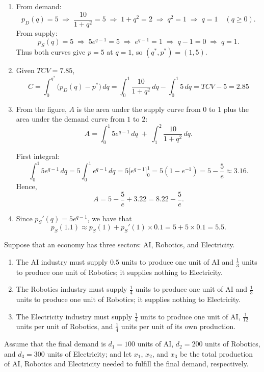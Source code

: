 \documentclass[11pt]{exam}
\begin{document}
\begin{questions}
\begin{solution}[0cm]
\begin{enumerate}[leftmargin = 0.5cm, label = (\alph*), rightmargin = 0.2cm]
    \item 
    From demand:
    \[
        p_D(q) = 5 
        \;\Rightarrow\; \frac{10}{1+q^2} = 5 
        \;\Rightarrow\; 1 + q^2 = 2 
        \;\Rightarrow\; q^2 = 1 
        \;\Rightarrow\; q = 1 \quad (q \ge 0).
    \]
    From supply:
    \[
        p_S(q) = 5 
        \;\Rightarrow\; 5e^{q-1} = 5 
        \;\Rightarrow\; e^{q-1} = 1 
        \;\Rightarrow\; q - 1 = 0 
        \;\Rightarrow\; q = 1.
    \]
    Thus both curves give $p = 5$ at $q = 1$, so $(q^*,p^*) = (1,5)$.

    \item Given $TCV = 7.85$,
    \[
        C = \int_0^{q^*} \bigl(p_D(q) - p^*\bigr)\,dq
          = \int_0^{1} \frac{10}{1+q^2}\,dq - \int_0^{1} 5\,dq
          = TCV - 5 = 2.85
    \]

    \item 
    From the figure, $A$ is the area under the supply curve from $0$ to $1$ plus the area under the demand curve from $1$ to $2$:
    \[
        A = \int_0^{1} 5e^{q-1}\,dq \;+\; \int_1^{2} \frac{10}{1+q^2}\,dq.
    \]

    First integral:
    \[
        \int_0^{1} 5e^{q-1}\,dq 
        = 5 \int_0^{1} e^{q-1}\,dq
        = 5\bigl[e^{q-1}\bigr]_0^{1}
        = 5(1 - e^{-1}) 
        = 5 - \frac{5}{e}
        \approx 3.16.
    \]
    Hence,
    \[
        A = 5 - \frac{5}{e} + 3.22 = 8.22 - \frac{5}{e}.
    \]

    \item Since $p_S'(q) = 5e^{q-1}$, we have that
    $$
    p_S(1.1) \approx p_S(1) + p_S'(1)\times0.1 = 5 + 5\times 0.1 = 5.5.  
    $$
\end{enumerate}
\end{solution}


\question[3]
Suppose that an economy has three sectors: AI, Robotics, and Electricity.
\begin{enumerate}[leftmargin = 0.5cm, label = (\textit{\roman*}), rightmargin = 0.2cm]
    \item The AI industry must supply $0.5$ units to produce one unit of AI and $\tfrac{1}{3}$ units to produce one unit of Robotics; it supplies nothing to Electricity.
    \item The Robotics industry must supply $\tfrac{1}{4}$ units to produce one unit of AI and $\tfrac{1}{3}$ units to produce one unit of Robotics; it supplies nothing to Electricity.
    \item The Electricity industry must supply $\tfrac{1}{4}$ units to produce one unit of AI, $\tfrac{1}{12}$ units per unit of Robotics, and $\tfrac{1}{4}$ units per unit of its own production.
\end{enumerate}
Assume that the final demand is $d_1 = 100$ units of AI, $d_2 = 200$ units of Robotics, and $d_3 = 300$ units of Electricity; and let $x_1$, $x_2$, and $x_3$ be the total production of AI, Robotics and Electricity needed to fulfill the final demand, respectively.


\end{questions}
\end{document}
